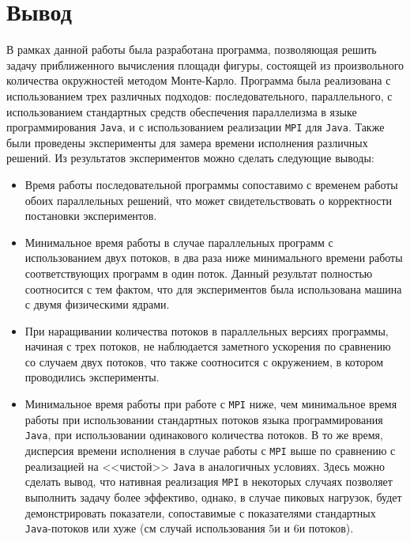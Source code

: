 \section{Вывод}

В рамках данной работы была разработана программа, позволяющая решить задачу приближенного вычисления площади фигуры, состоящей из
произвольного количества окружностей методом Монте-Карло. Программа была реализована с использованием трех различных подходов:
последовательного, параллельного, с использованием стандартных средств обеспечения параллелизма в языке программирования \texttt{Java},
и с использованием реализации \texttt{MPI} для \texttt{Java}. Также были проведены эксперименты для замера времени исполнения 
различных решений. Из результатов экспериментов можно сделать следующие выводы:
\begin{itemize}
    \item Время работы последовательной программы сопоставимо с временем работы обоих параллельных решений, что может 
        свидетельствовать о корректности постановки экспериментов.
    \item Минимальное время работы в случае параллельных программ с использованием двух потоков, в два раза ниже минимального времени 
        работы соответствующих программ в один поток. Данный результат полностью соотносится с тем фактом, что для экспериментов
        была использована машина с двумя физическими ядрами.
    \item При наращивании количества потоков в параллельных версиях программы, начиная с трех потоков, не наблюдается заметного 
        ускорения по сравнению со случаем двух потоков, что также соотносится с окружением, в котором проводились эксперименты.
    \item Минимальное время работы при работе с \texttt{MPI} ниже, чем минимальное время работы при использовании стандартных 
        потоков языка программирования \texttt{Java}, при использовании одинакового количества потоков. В то же время, дисперсия
        времени исполнения в случае работы с \texttt{MPI} выше по сравнению с реализацией на <<чистой>> \texttt{Java} в аналогичных
        условиях. Здесь можно сделать вывод, что нативная реализация \texttt{MPI} в некоторых случаях позволяет выполнить задачу
        более эффективо, однако, в случае пиковых нагрузок, будет демонстрировать показатели, сопоставимые с показателями стандартных
        \texttt{Java}-потоков или хуже (см случай использования $5$и и $6$и потоков).
\end{itemize}
